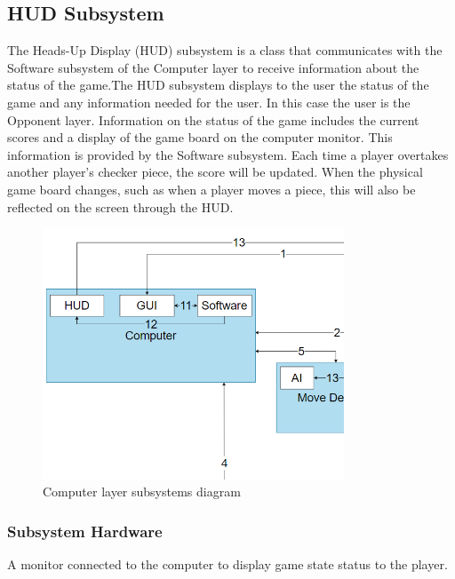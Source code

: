 \subsection{HUD Subsystem}
The Heads-Up Display (HUD) subsystem is a class that communicates with the Software subsystem of the Computer layer to receive information about the status of the game.The HUD subsystem displays to the user the status of the game and any information needed for the user. In this case the user is the Opponent layer. Information on the status of the game includes the current scores and a display of the game board on the computer monitor. This information is provided by the Software subsystem. Each time a player overtakes another player's checker piece, the score will be updated. When the physical game board changes, such as when a player moves a piece, this will also be reflected on the screen through the HUD.

\begin{figure}[h!]
	\centering
 	\includegraphics[width=0.80\textwidth]{images/computer_subsystems.png}
 \caption{Computer layer subsystems diagram}
\end{figure}

\subsubsection{Subsystem Hardware}
A monitor connected to the computer to display game state status to the player.


